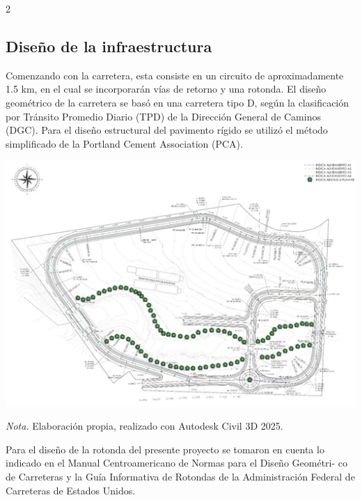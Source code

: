 \documentclass[12pt,spanish,Letterpaper,openany]{book}
\begin{document}
\begin {multicols}{2}
\hypertarget{diseuxf1o-de-la-infraestructura}{%
\subsection{Diseño de la infraestructura}\label{diseuxf1o-de-la-infraestructura}}

Comenzando con la carretera, esta consiste en un circuito de aproximadamente 1.5 km, en el cual se incorporarán vías de retorno y una rotonda. El diseño geométrico de la carretera se basó en una carretera tipo D, según la clasificación por Tránsito Promedio Diario (TPD) de la Dirección General de Caminos (DGC). Para el diseño estructural del pavimento rígido se utilizó el método simplificado de la Portland Cement Association (PCA).

\begin {flushleft}
\noindent\begin{minipage}[c]{\columnwidth}

\textbf{}

\begin{center}\includegraphics[width=0.95\linewidth]{imagenes_articulos/art03_03} \end{center}

\emph{Nota.} Elaboración propia, realizado con Autodesk Civil 3D 2025.

\end{minipage}
\end {flushleft}

Para el diseño de la rotonda del presente proyecto se tomaron en cuenta lo indicado en el Manual Centroamericano de Normas para el Diseño Geométri-
co de Carreteras y la Guía Informativa de Rotondas de la Administración Federal de Carreteras de Estados Unidos.


\end{multicols}
\end{document}
